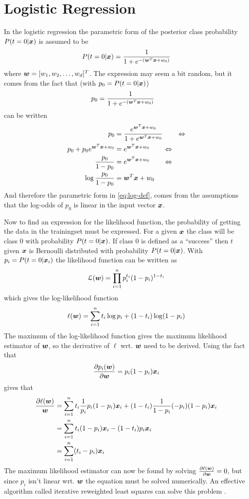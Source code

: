 \section{Logistic Regression}
In the logistic regression the parametric form of the posterior class probability $P(t=0|\boldsymbol{x})$ is assumed to be
\begin{equation}\label{eq:log-def}
    P(t=0|\boldsymbol{x}) = \frac{1}{1+e^{-(\boldsymbol{w}^T\boldsymbol{x}+w_0)}}
\end{equation}
where $\boldsymbol{w}=[w_1, w_2, \dots, w_d]^T$. The expression may seem a bit random, but it comes from the fact that (with $p_0=P(t=0|\boldsymbol{x})$)
\begin{align*}
    p_0 &= \frac{1}{1+e^{-(\boldsymbol{w}^T\boldsymbol{x}+w_0)}} 
\end{align*}
can be written
\begin{align*}
    p_0 &= \frac{e^{\boldsymbol{w}^T\boldsymbol{x}+w_0}}{1+e^{\boldsymbol{w}^T\boldsymbol{x}+w_0}} \quad\quad\Leftrightarrow \\
    p_0 + p_0e^{\boldsymbol{w}^T\boldsymbol{x}+w_0} &= e^{\boldsymbol{w}^T\boldsymbol{x}+w_0} \quad\quad\Leftrightarrow \\
    \frac{p_0}{1-p_0} &= e^{\boldsymbol{w}^T\boldsymbol{x}+w_0} \quad\quad\Leftrightarrow \\
    \log \frac{p_0}{1-p_0} &= \boldsymbol{w}^T\boldsymbol{x}+w_0
\end{align*}
And therefore the parametric form in \eqref{eq:log-def}, comes from the assumptions that the log-odds of $p_0$ is linear in the input vector $\boldsymbol{x}$. \par
Now to find an expression for the likelihood function, the probability of getting the data in the trainingset must be expressed. For a given $\boldsymbol{x}$ the class will be class 0 with probability $P(t=0|\boldsymbol{x})$. If class 0 is defined as a ``success'' then $t$ given $\boldsymbol{x}$ is Bernoulli distributed with probability $P(t=0|\boldsymbol{x})$. With $p_i=P(t=0|\boldsymbol{x}_i)$ the likelihood function can be written as
\[
    \mathcal{L}(\boldsymbol{w}) = \prod_{i=1}^n p_i^{t_i}(1-p_i)^{1-t_i}
\]
which gives the log-likelihood function
\begin{equation}\label{eq:log-like-logistic}
    \ell(\boldsymbol{w}) = \sum_{i=1}^n t_i\log p_i + (1-t_i)\log(1-p_i)
\end{equation}
The maximum of the log-likelihood function gives the maximum likelihood estimator of $\boldsymbol{w}$, so the derivative of $\ell$ wrt. $\boldsymbol{w}$ need to be derived. Using the fact that
\[
    \frac{\partial p_i(\boldsymbol{w})}{\partial \boldsymbol{w}} = p_i(1-p_i)\boldsymbol{x}_i
\]
gives that
\begin{align*}
    \frac{\partial \ell(\boldsymbol{w})}{\boldsymbol{w}} &= \sum_{i=1}^n t_i \frac{1}{p_i}p_i(1-p_i)\boldsymbol{x}_i + (1-t_i)\frac{1}{1-p_i}(-p_i)(1-p_i)\boldsymbol{x}_i \\
    &= \sum_{i=1}^n t_i(1-p_i)\boldsymbol{x}_i - (1-t_i)p_i\boldsymbol{x}_i \\
    &= \sum_{i=1}^n (t_i-p_i)\boldsymbol{x}_i
\end{align*}
The maximum likelihood estimator can now be found by solving $\frac{\partial\ell(\boldsymbol{w})}{\partial\boldsymbol{w}}=0$, but since $p_i$ isn't linear wrt. $\boldsymbol{w}$ the equation must be solved numerically. An effective algorithm called iterative reweighted least squares can solve this problem \citep[p.207]{bishop}.

